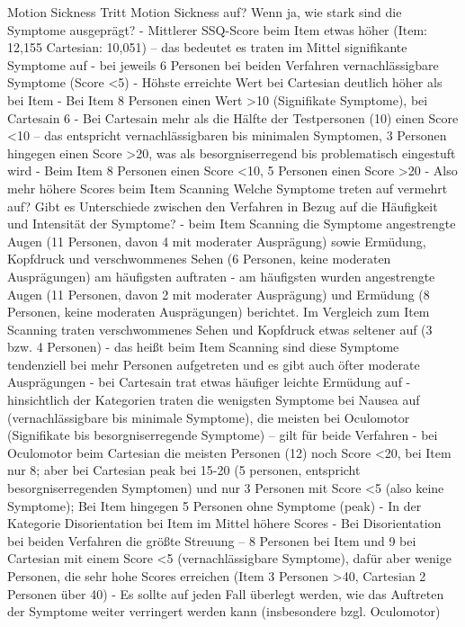 Motion Sickness
Tritt Motion Sickness auf? Wenn ja, wie stark sind die Symptome ausgeprägt?
-	Mittlerer SSQ-Score beim Item etwas höher (Item: 12,155 Cartesian: 10,051) – das bedeutet es traten im Mittel signifikante Symptome auf 
-	bei jeweils 6 Personen bei beiden Verfahren vernachlässigbare Symptome (Score <5) 
-	Höhste erreichte Wert bei Cartesian deutlich höher als bei Item 
-	Bei Item 8 Personen einen Wert >10 (Signifikate Symptome), bei Cartesain 6 
-	Bei Cartesain mehr als die Hälfte der Testpersonen (10) einen Score <10 – das entspricht vernachlässigbaren bis minimalen Symptomen, 3 Personen hingegen einen Score >20, was als besorgniserregend bis problematisch eingestuft wird 
-	Beim Item 8 Personen einen Score <10, 5 Personen einen Score >20 
-	Also mehr höhere Scores beim Item Scanning 
Welche Symptome treten auf vermehrt auf? Gibt es Unterschiede zwischen den Verfahren in Bezug auf die Häufigkeit und Intensität der Symptome?
-	beim Item Scanning die Symptome angestrengte Augen (11 Personen, davon 4 mit moderater Ausprägung) sowie Ermüdung, Kopfdruck und verschwommenes Sehen (6 Personen, keine moderaten Ausprägungen) am häufigsten auftraten
-	am häufigsten wurden angestrengte Augen (11 Personen, davon 2 mit moderater Ausprägung) und Ermüdung (8 Personen, keine moderaten Ausprägungen) berichtet. Im Vergleich zum Item Scanning traten verschwommenes Sehen und Kopfdruck etwas seltener auf (3 bzw. 4 Personen)
-	das heißt beim Item Scanning sind diese Symptome tendenziell bei mehr Personen aufgetreten und es gibt auch öfter moderate Ausprägungen 
-	bei Cartesain trat etwas häufiger leichte Ermüdung auf  
-	hinsichtlich der Kategorien traten die wenigsten Symptome bei Nausea auf (vernachlässigbare bis minimale Symptome), die meisten bei Oculomotor (Signifikate bis besorgniserregende Symptome) – gilt für beide Verfahren 
-	bei Oculomotor beim Cartesian die meisten Personen (12) noch Score <20, bei Item nur 8; aber bei Cartesian peak bei 15-20 (5 personen, entspricht besorgniserregenden Symptomen) und nur 3 Personen mit Score <5 (also keine Symptome); Bei Item hingegen 5 Personen ohne Symptome (peak) 
-	In der Kategorie Disorientation bei Item im Mittel höhere Scores 
-	Bei Disorientation bei beiden Verfahren die größte Streuung – 8 Personen bei Item und 9 bei Cartesian mit einem Score <5 (vernachlässigbare Symptome), dafür aber wenige Personen, die sehr hohe Scores erreichen (Item 3 Personen >40, Cartesian 2 Personen über 40) 
-	Es sollte auf jeden Fall überlegt werden, wie das Auftreten der Symptome weiter verringert werden kann (insbesondere bzgl. Oculomotor) 
